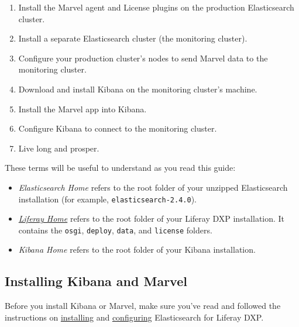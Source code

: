 \begin{enumerate}
\def\labelenumi{\arabic{enumi}.}
\tightlist
\item
  Install the Marvel agent and License plugins on the production
  Elasticsearch cluster.
\item
  Install a separate Elasticsearch cluster (the monitoring cluster).
\item
  Configure your production cluster's nodes to send Marvel data to the
  monitoring cluster.
\item
  Download and install Kibana on the monitoring cluster's machine.
\item
  Install the Marvel app into Kibana.
\item
  Configure Kibana to connect to the monitoring cluster.
\item
  Live long and prosper.
\end{enumerate}

\noindent\hrulefill

These terms will be useful to understand as you read this guide:

\begin{itemize}
\tightlist
\item
  \emph{Elasticsearch Home} refers to the root folder of your unzipped
  Elasticsearch installation (for example,
  \texttt{elasticsearch-2.4.0}).
\item
  \href{/docs/7-0/deploy/-/knowledge_base/d/installing-product\#liferay-home}{\emph{Liferay
  Home}} refers to the root folder of your Liferay DXP installation. It
  contains the \texttt{osgi}, \texttt{deploy}, \texttt{data}, and
  \texttt{license} folders.
\item
  \emph{Kibana Home} refers to the root folder of your Kibana
  installation.
\end{itemize}

\subsection{Installing Kibana and
Marvel}\label{installing-kibana-and-marvel}

Before you install Kibana or Marvel, make sure you've read and followed
the instructions on
\href{/docs/7-0/deploy/-/knowledge_base/d/installing-elasticsearch}{installing}
and
\href{/docs/7-0/deploy/-/knowledge_base/d/configuring-elasticsearch-for-liferay-0}{configuring}
Elasticsearch for Liferay DXP.

